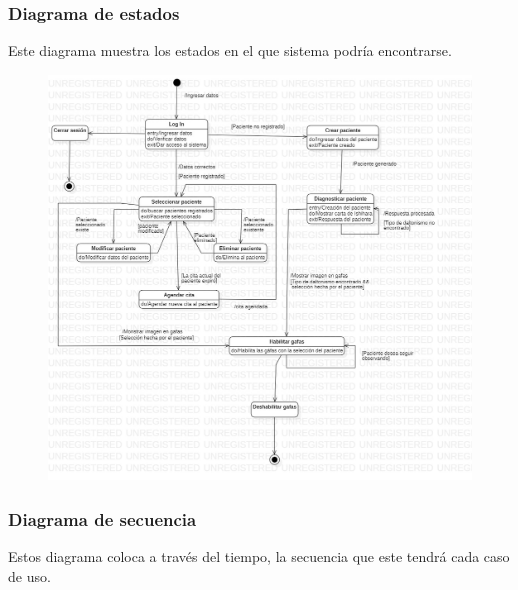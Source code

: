 \documentclass[10pt]{article}
\begin{document}
\subsubsection{Diagrama de estados}

Este diagrama muestra los estados en el que sistema podría encontrarse.

\begin{figure}[H]
	\begin{center}
\includegraphics[scale = 0.30]{UML/StatechartDiagram1.jpg}
	\end{center} 
\end{figure}
\newpage
\subsubsection{Diagrama de secuencia}

Estos diagrama coloca a través del tiempo, la secuencia que este tendrá cada caso de uso.
\end{document}
